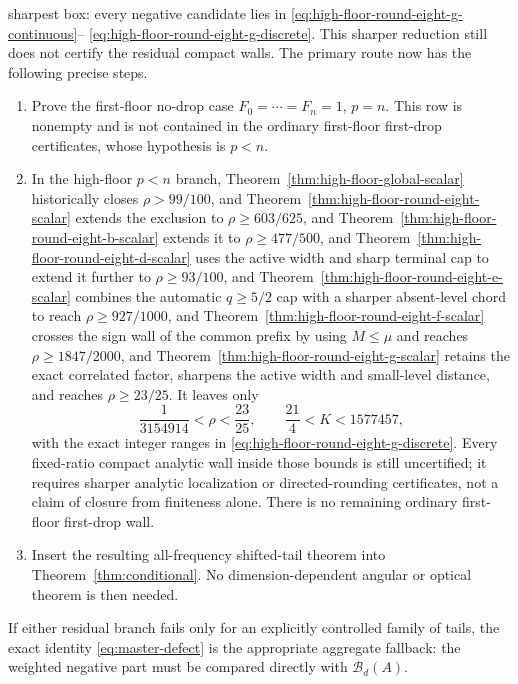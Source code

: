 \documentclass[11pt]{article}
\theoremstyle{remark}
\begin{document}
 sharpest box:
 every negative candidate lies in
 \eqref{eq:high-floor-round-eight-g-continuous}--%
 \eqref{eq:high-floor-round-eight-g-discrete}.  This sharper reduction still
 does not certify the residual compact walls.  The primary route now has
 the following precise steps.
\begin{enumerate}
 \item Prove the first-floor no-drop case
 $F_0=\cdots=F_n=1$, $p=n$.  This row is nonempty and is not contained in
 the ordinary first-floor first-drop certificates, whose hypothesis is
 $p<n$.
 \item In the high-floor $p<n$ branch,
 Theorem~\ref{thm:high-floor-global-scalar} historically closes
 $\rho>99/100$, and
 Theorem~\ref{thm:high-floor-round-eight-scalar} extends the exclusion to
 $\rho\geq603/625$, and
 Theorem~\ref{thm:high-floor-round-eight-b-scalar} extends it to
 $\rho\geq477/500$, and
 Theorem~\ref{thm:high-floor-round-eight-d-scalar} uses the active width
 and sharp terminal cap to extend it further to $\rho\geq93/100$, and
 Theorem~\ref{thm:high-floor-round-eight-e-scalar} combines the automatic
 $q\geq5/2$ cap with a sharper absent-level chord to reach
 $\rho\geq927/1000$, and
 Theorem~\ref{thm:high-floor-round-eight-f-scalar} crosses the sign wall of
 the common prefix by using $M\leq\mu$ and reaches
 $\rho\geq1847/2000$, and
 Theorem~\ref{thm:high-floor-round-eight-g-scalar} retains the exact
 correlated factor, sharpens the active width and small-level distance,
 and reaches $\rho\geq23/25$.
 It leaves only
 \[
  \frac1{3154914}<\rho<\frac{23}{25},\qquad
  \frac{21}{4}<K<1577457,
 \]
 with the exact integer ranges in
 \eqref{eq:high-floor-round-eight-g-discrete}.  Every fixed-ratio compact
 analytic wall inside those bounds is still uncertified; it requires
 sharper analytic localization or directed-rounding certificates, not a
 claim of closure from finiteness alone.  There is no remaining ordinary
 first-floor first-drop wall.
 \item Insert the resulting all-frequency shifted-tail theorem into
 Theorem~\ref{thm:conditional}.  No dimension-dependent angular or optical
 theorem is then needed.
\end{enumerate}
If either residual branch fails only for an explicitly controlled family of tails,
the exact identity \eqref{eq:master-defect} is the appropriate aggregate
fallback: the weighted negative part must be compared directly with
$\mathcal B_d(A)$.
\end{document}
